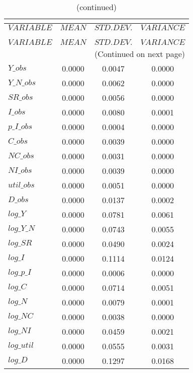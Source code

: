  
\begin{center}
\begin{longtable}{lccc} 
\caption{THEORETICAL MOMENTS}\\
 \label{Table:th_moments}\\
\toprule 
$VARIABLE   $	 & 	 $         MEAN$	 & 	 $    STD. DEV.$	 & 	 $     VARIANCE$\\
\midrule \endfirsthead 
\caption{(continued)}\\
 \toprule \\ 
$VARIABLE   $	 & 	 $         MEAN$	 & 	 $    STD. DEV.$	 & 	 $     VARIANCE$\\
\midrule \endhead 
\midrule \multicolumn{4}{r}{(Continued on next page)} \\ \bottomrule \endfoot 
\bottomrule \endlastfoot 
$Y\_obs     $	 & 	       0.0000	 & 	       0.0047	 & 	       0.0000 \\ 
$Y\_N\_obs  $	 & 	       0.0000	 & 	       0.0062	 & 	       0.0000 \\ 
$SR\_obs    $	 & 	       0.0000	 & 	       0.0056	 & 	       0.0000 \\ 
$I\_obs     $	 & 	       0.0000	 & 	       0.0080	 & 	       0.0001 \\ 
$p\_I\_obs  $	 & 	       0.0000	 & 	       0.0004	 & 	       0.0000 \\ 
$C\_obs     $	 & 	       0.0000	 & 	       0.0039	 & 	       0.0000 \\ 
$NC\_obs    $	 & 	       0.0000	 & 	       0.0031	 & 	       0.0000 \\ 
$NI\_obs    $	 & 	       0.0000	 & 	       0.0039	 & 	       0.0000 \\ 
$util\_obs  $	 & 	       0.0000	 & 	       0.0051	 & 	       0.0000 \\ 
$D\_obs     $	 & 	       0.0000	 & 	       0.0137	 & 	       0.0002 \\ 
$log\_Y     $	 & 	       0.0000	 & 	       0.0781	 & 	       0.0061 \\ 
$log\_Y\_N  $	 & 	       0.0000	 & 	       0.0743	 & 	       0.0055 \\ 
$log\_SR    $	 & 	       0.0000	 & 	       0.0490	 & 	       0.0024 \\ 
$log\_I     $	 & 	       0.0000	 & 	       0.1114	 & 	       0.0124 \\ 
$log\_p\_I  $	 & 	       0.0000	 & 	       0.0006	 & 	       0.0000 \\ 
$log\_C     $	 & 	       0.0000	 & 	       0.0714	 & 	       0.0051 \\ 
$log\_N     $	 & 	       0.0000	 & 	       0.0079	 & 	       0.0001 \\ 
$log\_NC    $	 & 	       0.0000	 & 	       0.0038	 & 	       0.0000 \\ 
$log\_NI    $	 & 	       0.0000	 & 	       0.0459	 & 	       0.0021 \\ 
$log\_util  $	 & 	       0.0000	 & 	       0.0555	 & 	       0.0031 \\ 
$log\_D     $	 & 	       0.0000	 & 	       0.1297	 & 	       0.0168 \\ 
\end{longtable}
 \end{center}
